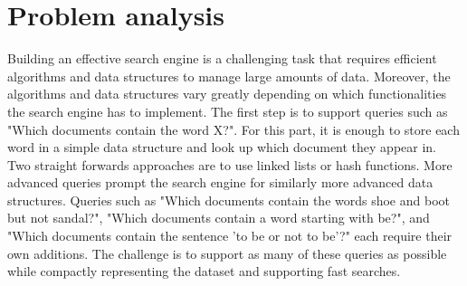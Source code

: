 \section{Problem analysis}

Building an effective search engine is a challenging task that requires efficient algorithms and data structures to manage large amounts of data. Moreover, the algorithms and data structures vary greatly depending on which functionalities the search engine has to implement. The first step is to support queries such as "Which documents contain the word X?". For this part, it is enough to store each word in a simple data structure and look up which document they appear in. Two straight forwards approaches are to use linked lists or hash functions. More advanced queries prompt the search engine for similarly more advanced data structures. Queries such as "Which documents contain the words shoe and boot but not sandal?", "Which documents contain a word starting with be?", and "Which documents contain the sentence 'to be or not to be'?" each require their own additions. The challenge is to support as many of these queries as possible while compactly representing the dataset and supporting fast searches. 



